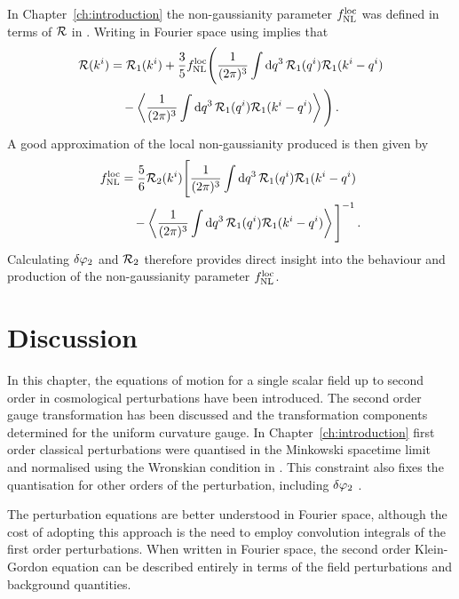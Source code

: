 In Chapter~\ref{ch:introduction} the non-gaussianity parameter $f_{\mathrm{NL}}^\mathrm{loc}$ was defined
in terms of $\mathcal{R}$ in . Writing  in
Fourier space using  implies that
% 
\begin{align}
 \R(\kvi) &= \R_1(\kvi)
  + \frac{3}{5}\fnlloc \Bigg( \frac{1}{(2\pi)^3}\int \d q^3\, \R_1(\qvi)
\R_1(\kvi-\qvi) \\ \nonumber
% 
  &\quad- \left\langle \frac{1}{(2\pi)^3} \int \d q^3\, \R_1(\qvi)
\R_1(\kvi-\qvi) \right\rangle \Bigg) \,.
\end{align}
% 
A good approximation of the local non-gaussianity produced is then given by
% 
\begin{align}
 \label{eq:fnlloc-perts}
\fnlloc &= \frac{5}{6} \R_2(\kvi) \Bigg[ \frac{1}{(2\pi)^3}\int \d q^3\, \R_1(\qvi)
\R_1(\kvi-\qvi) \\ \nonumber
% 
  &\quad- \left\langle \frac{1}{(2\pi)^3} \int \d q^3\, \R_1(\qvi)
\R_1(\kvi-\qvi) \right\rangle \Bigg]^{-1} \,.
\end{align}
% 
Calculating $\delta\varphi_{2}$ and $\mathcal{R}_2$ therefore provides direct insight into the behaviour
and
production of the non-gaussianity parameter $f_{\mathrm{NL}}^\mathrm{loc}$. 

% 
% 
% 
% 
\section{Discussion}
\label{sec:disc-perts}

In this chapter, the equations of motion for a single scalar
field
up to second order in cosmological perturbations have been introduced. The second
order gauge
transformation has been discussed and the transformation components determined for
the uniform curvature gauge.
% 
In Chapter~\ref{ch:introduction} first order classical perturbations were quantised
in the Minkowski spacetime limit and normalised using the Wronskian condition in
. This constraint also fixes the quantisation for other
orders of the perturbation, including $\delta\varphi_{2}$ \cite{Seery:2008qj}. 

The perturbation equations are better understood in Fourier space, although the cost
of adopting this approach is the need to employ convolution integrals of the first
order
perturbations. When written in Fourier space, the second order Klein-Gordon equation
can
be described entirely in terms of the field perturbations and background quantities. 

